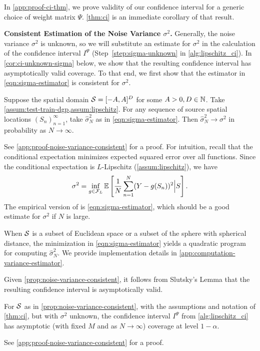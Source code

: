 In \cref{app:proof-ci-thm}, we prove validity of our confidence interval for a generic choice of weight matrix $\Psi$. \cref{thm:ci} is an immediate corollary of that result.

\textbf{Consistent Estimation of the Noise Variance $\sigma^2$.}
Generally, the noise variance $\sigma^2$ is unknown, so we will substitute an estimate for $\sigma^2$ in the calculation of the confidence interval $I^{\Psi}$ (Step~\ref{step:sigma-unknown} in \cref{alg:lipschitz_ci}). In \cref{cor:ci-unknown-sigma} below, we show that the resulting confidence interval has asymptotically valid coverage. To that end, we first show that the estimator in \cref{eqn:sigma-estimator} is consistent for $\sigma^2$.
\begin{proposition}\label{prop:noise-variance-consistent}
 Suppose the spatial domain $\mathcal{S} = [-A, A]^D$ for some $A>0, D \in \mathbb{N}$. Take \cref{assum:test-train-dgp,assum:lipschitz}. For any sequence of source spatial locations $(S_n)_{n=1}^\infty$, take $\hat{\sigma}^2_N$ as in \cref{eqn:sigma-estimator}. 
Then $\hat{\sigma}^2_N \to \sigma^2$ in probability as $N \rightarrow \infty$.
\end{proposition}
%
See \cref{app:proof-noise-variance-consistent} for a proof. For intuition, recall that the conditional expectation minimizes expected squared error over all functions. Since the conditional expectation is $L$-Lipschitz (\cref{assum:lipschitz}), we have
\begin{align}
    \sigma^2  
    = \inf_{g \in \mathcal{F}_L} \mathbb{E}\left[\frac{1}{N}\sum_{n=1}^N(Y - g(S_n))^2 \Big\vert S\right]. \label{eqn:sigma-sq-inf}
\end{align}
The empirical version of  is \cref{eqn:sigma-estimator},
which should be a good estimate for $\sigma^2$ if $N$ is large. 

When $\mathcal{S}$ is a subset of Euclidean space or a subset of the sphere with spherical distance, the minimization in \cref{eqn:sigma-estimator} yields a quadratic program for computing $\hat{\sigma}^2_N$. We provide implementation details in \cref{app:computation-variance-estimator}.

Given \cref{prop:noise-variance-consistent}, it follows from Slutsky's Lemma that the resulting confidence interval is asymptotically valid.
%
\begin{corollary}\label{cor:ci-unknown-sigma}
For $\mathcal{S}$ as in \cref{prop:noise-variance-consistent}, with the assumptions and notation of \cref{thm:ci}, but with $\sigma^2$ unknown, the confidence interval $I^{\Psi}$ from \cref{alg:lipschitz_ci} has asymptotic (with fixed $M$ and as $N \to \infty$) coverage at level $1-\alpha$.
\end{corollary}
%
See \cref{app:proof-noise-variance-consistent} for a proof.


